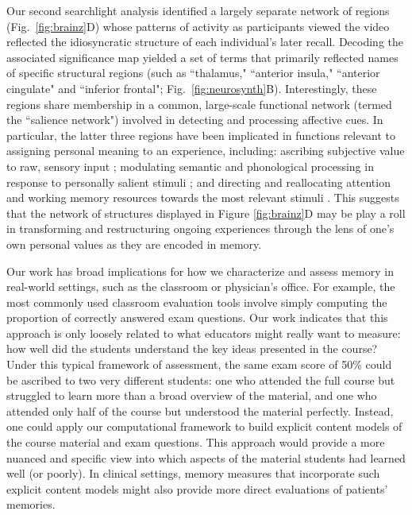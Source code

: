 \documentclass{article}
\begin{document}
Our second searchlight analysis identified a largely separate network of regions (Fig.~\ref{fig:brainz}D) whose patterns of activity as participants viewed the video reflected the idiosyncratic structure of each individual's later recall.  Decoding the associated significance map yielded a set of terms that primarily reflected names of specific structural regions (such as ``thalamus," ``anterior insula," ``anterior cingulate" and ``inferior frontal"; Fig.~\ref{fig:neurosynth}B).  Interestingly, these regions share membership in a common, large-scale functional network (termed the ``salience network") involved in detecting and processing affective cues.  In particular, the latter three regions have been implicated in functions relevant to assigning personal meaning to an experience, including: ascribing subjective value to raw, sensory input \citep{MedfCrit10}; modulating semantic and phonological processing in response to personally salient stimuli \citep{KellEtal07b}; and directing and reallocating attention and working memory resources towards the most relevant stimuli \citep{MenoUddi10}.  This suggests that the network of structures displayed in Figure \ref{fig:brainz}D may be play a roll in transforming and restructuring ongoing experiences through the lens of one's own personal values as they are encoded in memory.

Our work has broad implications for how we characterize and assess memory in real-world settings, such as the classroom or physician's office.  For example, the most commonly used classroom evaluation tools involve simply computing the proportion of correctly answered exam questions.  Our work indicates that this approach is only loosely related to what educators might really want to measure: how well did the students understand the key ideas presented in the course?  Under this typical framework of assessment, the same exam score of 50\% could be ascribed to two very different students: one who attended the full course but struggled to learn more than a broad overview of the material, and one who attended only half of the course but understood the material perfectly.  Instead, one could apply our computational framework to build explicit content models of the course material and exam questions.  This approach would provide a more nuanced and specific view into which aspects of the material students had learned well (or poorly).  In clinical settings, memory measures that incorporate such explicit content models might also provide more direct evaluations of patients' memories.
\end{document}
